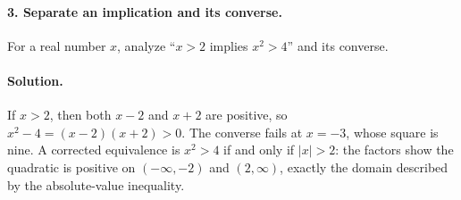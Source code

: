 \paragraph{3. Separate an implication and its converse.}
For a real number $x$, analyze ``$x>2$ implies $x^2>4$'' and its converse.

\paragraph{Solution.}
If $x>2$, then both $x-2$ and $x+2$ are positive, so
$x^2-4=(x-2)(x+2)>0$. The converse fails at $x=-3$, whose square is
nine. A corrected equivalence is $x^2>4$ if and only if $|x|>2$:
the factors show the quadratic is positive on $(-\infty,-2)$ and
$(2,\infty)$, exactly the domain described by the absolute-value inequality.


